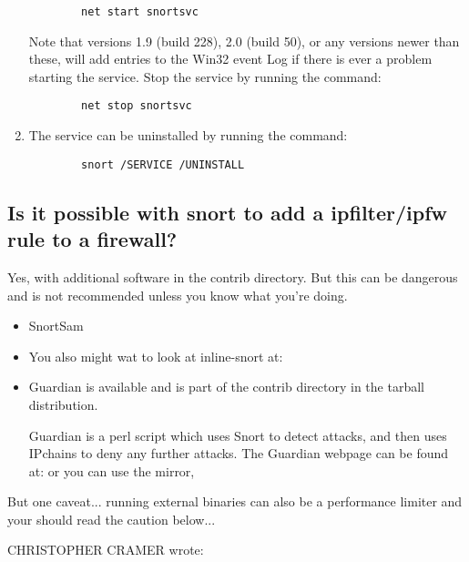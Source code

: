 \documentclass{article}
\begin{document}
\begin{enumerate}
\begin{verbatim}
        net start snortsvc
	\end{verbatim}
    Note that versions 1.9 (build 228), 2.0 (build 50), or any versions newer
    than these, will add entries to the Win32 event Log if there is ever a
    problem starting the service.
    Stop the service by running the command:
    \begin{verbatim}
        net stop snortsvc
    \end{verbatim}
\item  The service can be uninstalled by running the command:
	\begin{verbatim}
        snort /SERVICE /UNINSTALL
	\end{verbatim}
\end{enumerate}

\subsection{Is it possible with snort to add a ipfilter/ipfw rule to a firewall? }

Yes, with additional software in the contrib directory.  But this
can be dangerous and is not recommended unless you know what you're
doing.

\begin{itemize}
\item SnortSam

\item You also might wat to look at inline-snort at:
\item Guardian is available and is part of the contrib directory in the tarball distribution.

Guardian is a perl script which uses Snort to detect attacks,
and then uses IPchains to deny any further attacks. The Guardian webpage can be found at:
or you can use the mirror,

\end{itemize}
But one caveat... running external binaries can also be a performance
limiter and your should read the caution below...

CHRISTOPHER CRAMER wrote:
\end{document}
